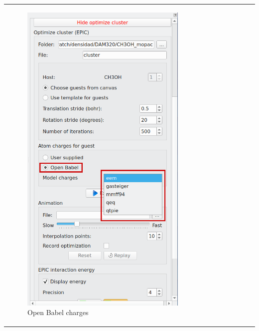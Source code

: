 \documentclass[10pt]{article}
\begin{document}
 
\begin{tabular}{lcr}
\begin{minipage}{.45\linewidth}
    \begin{figure}[H]
        \begin{center}
            \includegraphics[width=0.5\linewidth]{damqt320_mespimizer_5b.png}
        \end{center}
        \caption{Open Babel charges \label{fig:4_10_5}}
    \end{figure}
\end{minipage}
&
\begin{minipage}{.45\linewidth}
    \begin{figure}[H]
        \begin{center}
            \vspace*{0mm}

\end{center}
\end{figure}
\end{minipage}
\end{tabular}
\end{document}
